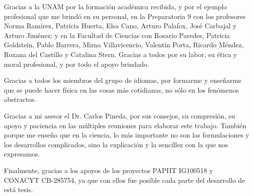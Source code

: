 
\begin{acknowledgementsacademic}

Gracias a la UNAM por la formación académica recibida, y por el ejemplo profesional que me brindó en su personal, en la Preparatoria 9 con los profesores Norma Ramírez, Patricia Huerta, Elsa Cano, Arturo Palafox, José Carbajal y Arturo Jiménez; y en la Facultad de Ciencias con  Rosario Paredes, Patricia Goldstein, Pablo Barrera, Mirna Villavicencio, Valentín Porta, Ricardo Méndez, Roxana del Castillo y Catalina Stern. Gracias a todos por su labor, su ética y moral profesional,  y por todo el apoyo brindado. 

\vspace{0.5cm}
Gracias a todos los miembros del  grupo de idiomas, por formarme y enseñarme que se puede hacer física en las cosas más cotidianas, no sólo en los fenómenos abstractos. 

\vspace{0.5cm}
Gracias a mi asesor el Dr. Carlos Pineda, por sus consejos, su compresión, su apoyo y paciencia en las múltiples reuniones para elaborar este trabajo. También porque me enseño que en la ciencia,  lo más importante no son las formulaciones y los desarrollos complicados, sino la explicación y la sencillez con la que nos expresamos. 

\vspace{0.5cm}
Finalmente, gracias a los apoyos de los proyectos PAPIIT IG100518 y CONACYT CB-285754, ya que con ellos fue posible cada parte del desarrollo de está tesis. 

\end{acknowledgementsacademic}




